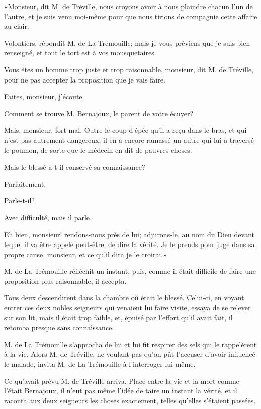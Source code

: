 «Monsieur, dit M. de Tréville, nous croyons avoir à nous plaindre chacun l'un de l'autre, et je suis venu moi-même pour que nous tirions de compagnie cette affaire au clair. 

\speak  Volontiers, répondit M. de La Trémouille; mais je vous préviens que je suis bien renseigné, et tout le tort est à vos mousquetaires. 

\speak  Vous êtes un homme trop juste et trop raisonnable, monsieur, dit M. de Tréville, pour ne pas accepter la proposition que je vais faire. 

\speak  Faites, monsieur, j'écoute. 

\speak  Comment se trouve M. Bernajoux, le parent de votre écuyer? 

\speak  Mais, monsieur, fort mal. Outre le coup d'épée qu'il a reçu dans le bras, et qui n'est pas autrement dangereux, il en a encore ramassé un autre qui lui a traversé le poumon, de sorte que le médecin en dit de pauvres choses. 

\speak  Mais le blessé a-t-il conservé sa connaissance? 

\speak  Parfaitement. 

\speak  Parle-t-il? 

\speak  Avec difficulté, mais il parle. 

\speak  Eh bien, monsieur! rendons-nous près de lui; adjurons-le, au nom du Dieu devant lequel il va être appelé peut-être, de dire la vérité. Je le prends pour juge dans sa propre cause, monsieur, et ce qu'il dira je le croirai.» 

M. de La Trémouille réfléchit un instant, puis, comme il était difficile de faire une proposition plus raisonnable, il accepta. 

Tous deux descendirent dans la chambre où était le blessé. Celui-ci, en voyant entrer ces deux nobles seigneurs qui venaient lui faire visite, essaya de se relever sur son lit, mais il était trop faible, et, épuisé par l'effort qu'il avait fait, il retomba presque sans connaissance. 

M. de La Trémouille s'approcha de lui et lui fit respirer des sels qui le rappelèrent à la vie. Alors M. de Tréville, ne voulant pas qu'on pût l'accuser d'avoir influencé le malade, invita M. de La Trémouille à l'interroger lui-même. 

Ce qu'avait prévu M. de Tréville arriva. Placé entre la vie et la mort comme l'était Bernajoux, il n'eut pas même l'idée de taire un instant la vérité, et il raconta aux deux seigneurs les choses exactement, telles qu'elles s'étaient passées. 

